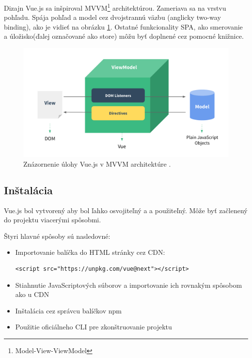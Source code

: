 Dizajn Vue.js sa inšpiroval MVVM\footnote{Model-View-ViewModel} architektúrou. Zameriava sa na vrstvu pohľadu. Spája pohľad a model cez dvojstrannú väzbu (anglicky two-way binding), ako je vidieť na obrázku \ref{pic:mvvm}. Ostatné funkcionality SPA, ako smerovanie a úložisko(ďalej označované ako store) môžu byť doplnené cez pomocné knižnice.
    \begin{figure}[!hbt]
        \centering
        \includegraphics[scale=0.2]{obrazky/mvvm.png}
        \caption{Znázornenie úlohy Vue.js v MVVM architektúre \cite{vue-guide}.}
        \label{pic:mvvm}
    \end{figure}

\subsection*{Inštalácia}
Vue.js bol vytvorený aby bol ľahko osvojiteľný a a použiteľný. Môže byť začlenený do projektu viacerými spôsobmi. 

Štyri hlavné spôsoby sú nasledovné:
    \begin{itemize}
        \item Importovanie balíčka do HTML stránky cez CDN:
        \begin{verbatim}<script src="https://unpkg.com/vue@next"></script>\end{verbatim}
        \item Stiahnutie JavaScriptových súborov a importovanie ich rovnakým spôsobom ako u CDN
        \item Inštalácia cez správcu balíčkov npm
        \item Použitie oficiálneho CLI pre zkonštruovanie projektu
    \end{itemize}
    
